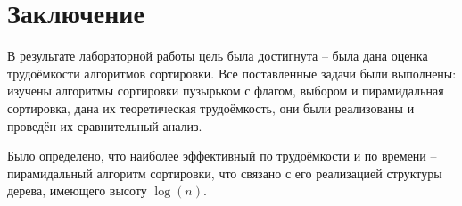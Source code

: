 \chapter*{Заключение}
\label{cha:conclusion}
В результате лабораторной работы цель была достигнута -- была дана оценка трудоёмкости алгоритмов сортировки. Все поставленные задачи были выполнены: изучены алгоритмы сортировки пузырьком с флагом, выбором и пирамидальная сортировка, дана их теоретическая трудоёмкость, они были реализованы и проведён их сравнительный анализ.
\par Было определено, что наиболее эффективный по трудоёмкости и по времени -- пирамидальный алгоритм сортировки, что связано с его реализацией структуры дерева, имеющего высоту $\log(n)$.